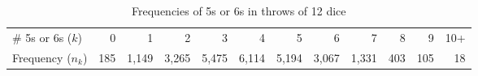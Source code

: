 \begin{table}[tb]
\centering
\caption{Frequencies of 5s or 6s in throws of 12 dice} \label{tab:dicetab}
\begin{tabular}{l|rrrrrrrrrrr}
   \hline
\# 5s or 6s ($k$) & 0 & 1 & 2 & 3 & 4 & 5 & 6 & 7 & 8 & 9 & 10+ \\ 
Frequency ($n_k$) &   185 &  1,149 &  3,265 &  5,475 &  6,114 &  5,194 &  3,067 &  1,331 &   403 &   105 &    18  \\ 
   \hline
\end{tabular}
\end{table}

